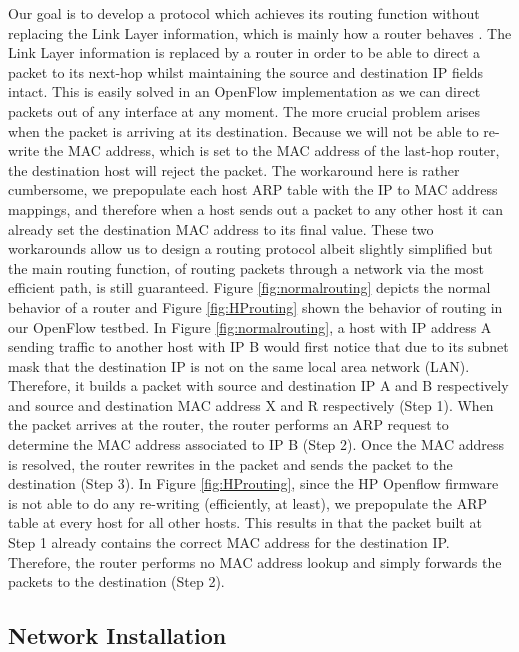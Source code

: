 Our goal is to develop a protocol which achieves its routing function without
replacing the Link Layer information, which is mainly how a router behaves
\cite{RFC1812}. The Link Layer information is replaced by a router in order to
be able to direct a packet to its next-hop whilst maintaining the source and
destination IP fields intact. This is easily solved in an OpenFlow
implementation as we can direct packets out of any interface at any moment. The
more crucial problem arises when the packet is arriving at its destination.
Because we will not be able to re-write the MAC address, which is set to the
MAC address of the last-hop router, the destination host will reject the
packet. The workaround here is rather cumbersome, we prepopulate each host ARP
table with the IP to MAC address mappings, and therefore when a host sends
out a packet to any other host it can already set the destination MAC address
to its final value. These two workarounds allow us to design a routing
protocol albeit slightly simplified but the main routing function, of routing
packets through a network via the most efficient path, is still guaranteed.
Figure \ref{fig:normalrouting} depicts the normal behavior of a router and Figure
\ref{fig:HProuting} shown the behavior of routing in our OpenFlow testbed. In
Figure \ref{fig:normalrouting}, a host with IP address A sending traffic to
another host with IP B would first notice that due to its subnet mask that the
destination IP is not on the same local area network (LAN). Therefore, it builds
a packet with source and destination IP A and B respectively and source and
destination MAC address X and R respectively (Step 1).  When the packet arrives
at the router, the router performs an ARP request to determine the MAC address
associated to IP B (Step 2). Once the MAC address is resolved, the router
rewrites in the packet and sends the packet to the destination (Step 3). In
Figure \ref{fig:HProuting}, since the HP Openflow firmware is not able to do any
re-writing (efficiently, at least), we prepopulate the ARP table at every host
for all other hosts. This results in that the packet built at Step 1 already
contains the correct MAC address for the destination IP. Therefore, the router
performs no MAC address lookup and simply forwards the packets to the
destination (Step 2).


\subsection{Network Installation}

